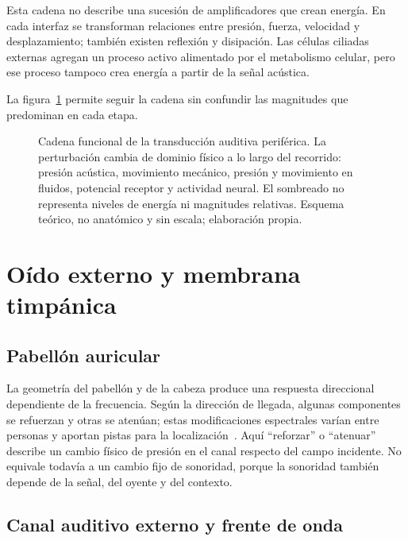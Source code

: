 Esta cadena no describe una sucesión de amplificadores que crean energía. En
cada interfaz se transforman relaciones entre presión, fuerza, velocidad y
desplazamiento; también existen reflexión y disipación. Las células ciliadas
externas agregan un proceso activo alimentado por el metabolismo celular, pero
ese proceso tampoco crea energía a partir de la señal acústica.

La figura~\ref{fig:sistema_auditivo} permite seguir la cadena sin confundir
las magnitudes que predominan en cada etapa.

\begin{figure}[htbp]
    \centering
    
    \caption{Cadena funcional de la transducción auditiva periférica. La
    perturbación cambia de dominio físico a lo largo del recorrido: presión
    acústica, movimiento mecánico, presión y movimiento en fluidos, potencial
    receptor y actividad neural. El sombreado no representa niveles de energía
    ni magnitudes relativas. Esquema teórico, no anatómico y sin escala;
    elaboración propia.}
    \label{fig:sistema_auditivo}
\end{figure}

\section{Oído externo y membrana timpánica}
\label{sec:u6-oido-externo}

\subsection{Pabellón auricular}
\label{sec:u6-pabellon}

La geometría del pabellón y de la cabeza produce una respuesta
direccional dependiente de la frecuencia. Según la dirección de llegada,
algunas componentes se refuerzan y otras se atenúan; estas modificaciones
espectrales varían entre personas y aportan pistas para la localización~\cite{carlini2024}.
Aquí ``reforzar'' o ``atenuar'' describe un cambio físico de presión en el
canal respecto del campo incidente. No equivale todavía a un cambio fijo de
sonoridad, porque la sonoridad también depende de la señal, del oyente y del
contexto.

\subsection{Canal auditivo externo y frente de onda}
\label{sec:u6-cae}

